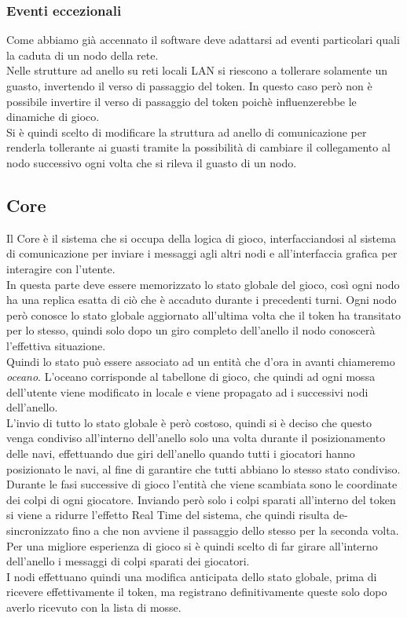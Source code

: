 \documentclass{llncs}
\begin{document}
\subsubsection{Eventi eccezionali}
Come abbiamo già accennato il software deve adattarsi ad eventi particolari quali la caduta di un nodo della rete.\\
Nelle strutture ad anello su reti locali LAN si riescono a tollerare solamente un guasto, invertendo il verso di passaggio del token. In questo caso però non è possibile invertire il verso di passaggio del token poichè influenzerebbe le dinamiche di gioco.\\
Si è quindi scelto di modificare la struttura ad anello di comunicazione per renderla tollerante ai guasti tramite la possibilità di cambiare il collegamento al nodo successivo ogni volta che si rileva il guasto di un nodo.\\
\subsection{Core}
Il Core è il sistema che si occupa della logica di gioco, interfacciandosi al sistema di comunicazione per inviare i messaggi agli altri nodi e all'interfaccia grafica per interagire con l'utente.\\
In questa parte deve essere memorizzato lo stato globale del gioco, così ogni nodo ha una replica esatta di ciò che è accaduto durante i precedenti turni. Ogni nodo però conosce lo stato globale aggiornato all'ultima volta che il token ha transitato per lo stesso, quindi solo dopo un giro completo dell'anello il nodo conoscerà l'effettiva situazione.\\
Quindi lo stato può essere associato ad un entità che d'ora in avanti chiameremo \emph{oceano}. L'oceano corrisponde al tabellone di gioco, che quindi ad ogni mossa dell'utente viene modificato in locale e viene  propagato ad i successivi nodi dell'anello.\\
L'invio di tutto lo stato globale è però costoso, quindi si è deciso che questo venga condiviso all'interno dell'anello solo una volta durante il posizionamento delle navi,  effettuando due giri dell'anello quando tutti i giocatori hanno posizionato le navi, al fine di garantire che tutti abbiano lo stesso stato condiviso.\\
Durante le fasi successive di gioco l'entità che viene scambiata sono le coordinate dei colpi di ogni giocatore. Inviando però solo i colpi sparati all'interno del token si viene a ridurre l'effetto Real Time del sistema, che quindi risulta de-sincronizzato fino a che non avviene il passaggio dello stesso per la seconda volta. Per una migliore esperienza di gioco si è quindi scelto di far girare all'interno dell'anello i messaggi di colpi sparati dei giocatori.\\
I nodi effettuano quindi una modifica anticipata dello stato globale, prima di ricevere effettivamente il token, ma registrano definitivamente queste solo dopo averlo ricevuto con la lista di mosse.\\
\end{document}
